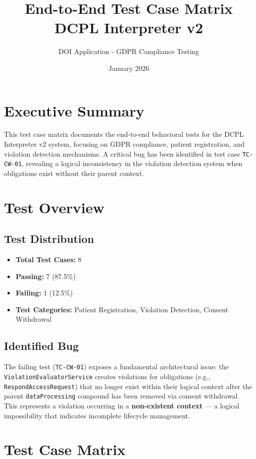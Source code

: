 \documentclass[11pt,a4paper]{article}
\title{End-to-End Test Case Matrix\\DCPL Interpreter v2}
\author{DOI Application - GDPR Compliance Testing}
\date{January 2026}
\begin{document}
\maketitle

\section{Executive Summary}

This test case matrix documents the end-to-end behavioral tests for the DCPL Interpreter v2 system, focusing on GDPR compliance, patient registration, and violation detection mechanisms. A critical bug has been identified in test case \texttt{TC-CW-01}, revealing a logical inconsistency in the violation detection system when obligations exist without their parent context.

\section{Test Overview}

\subsection{Test Distribution}
\begin{itemize}
    \item \textbf{Total Test Cases:} 8
    \item \textbf{Passing:} 7 (87.5\%)
    \item \textbf{Failing:} 1 (12.5\%)
    \item \textbf{Test Categories:} Patient Registration, Violation Detection, Consent Withdrawal
\end{itemize}

\subsection{Identified Bug}
The failing test (\texttt{TC-CW-01}) exposes a fundamental architectural issue: the \texttt{ViolationEvaluatorService} creates violations for obligations (e.g., \texttt{RespondAccessRequest}) that no longer exist within their logical context after the parent \texttt{dataProcessing} compound has been removed via consent withdrawal. This represents a violation occurring in a \textbf{non-existent context} --- a logical impossibility that indicates incomplete lifecycle management.

\section{Test Case Matrix}
\end{document}
